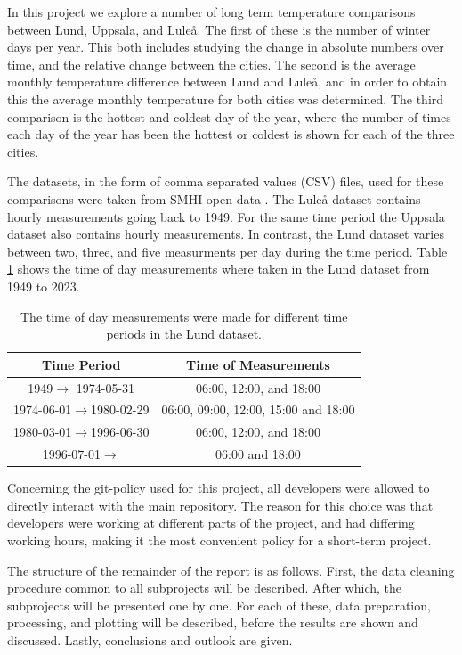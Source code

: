 \documentclass[aps,prl,groupedaddress,twocolumn]{revtex4-1}
\newcommand{\ra}{\rightarrow}
\begin{document}
In this project we explore a number of long term temperature comparisons between Lund, Uppsala, and Luleå. The first of these is the number of winter days per year. This both includes studying the change in absolute numbers over time, and the relative change between the cities. The second is the average monthly temperature difference between Lund and Luleå, and in order to obtain this the average monthly temperature for both cities was determined. The third comparison is the hottest and coldest day of the year, where the number of times each day of the year has been the hottest or coldest is shown for each of the three cities.

The datasets, in the form of comma separated values (CSV) files, used for these comparisons were taken from SMHI open data \cite{smhi}. The Luleå dataset contains hourly measurements going back to 1949. For the same time period the Uppsala dataset also contains hourly measurements. In contrast, the Lund dataset varies between two, three, and five measurments per day during the time period. Table \ref{tab:lund_meas_struct} shows the time of day measurements where taken in the Lund dataset from 1949 to 2023.

\begin{table}[h!]
    \centering
    \begin{tabular}{c|c}
        Time Period & Time of Measurements\\
        \hline
        1949$\ra$ 1974-05-31 & 06:00, 12:00, and 18:00 \\
        \hline
        1974-06-01$\ra$1980-02-29 & 06:00, 09:00, 12:00, 15:00 and 18:00\\
        \hline
        1980-03-01$\ra$1996-06-30 &  06:00, 12:00, and 18:00 \\
        \hline
        1996-07-01$\ra$ & 06:00 and 18:00\\
        \hline
    \end{tabular}
    \caption{The time of day measurements were made for different time periods in the Lund dataset.}
    \label{tab:lund_meas_struct}
\end{table}

Concerning the git-policy used for this project, all developers were allowed to directly interact with the main repository. The reason for this choice was that developers were working at different parts of the project, and had differing working hours, making it the most convenient policy for a short-term project.

The structure of the remainder of the report is as follows. First, the data cleaning procedure common to all subprojects will be described. After which, the subprojects will be presented one by one. For each of these, data preparation, processing, and plotting will be described, before the results are shown and discussed. Lastly, conclusions and outlook are given. %
\end{document}
